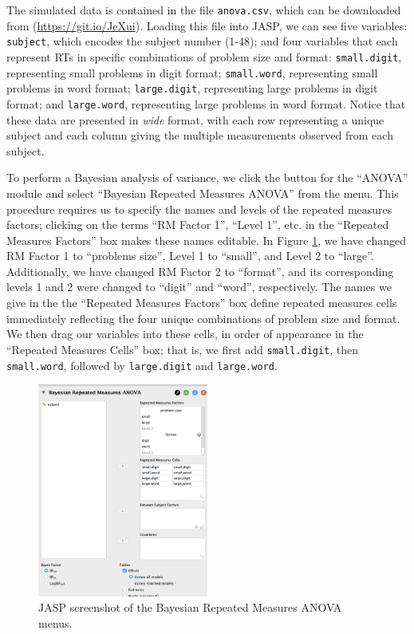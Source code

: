 \documentclass[english,,doc,floatsintext]{apa6}
\begin{document}
The simulated data is contained in the file \texttt{anova.csv}, which can be downloaded from (\url{https://git.io/JeXui}). Loading this file into JASP, we can see five variables: \texttt{subject}, which encodes the subject number (1-48); and four variables that each represent RTs in specific combinations of problem size and format: \texttt{small.digit}, representing small problems in digit format; \texttt{small.word}, representing small problems in word format; \texttt{large.digit}, representing large problems in digit format; and \texttt{large.word}, representing large problems in word format. Notice that these data are presented in \emph{wide} format, with each row representing a unique subject and each column giving the multiple measurements observed from each subject.

To perform a Bayesian analysis of variance, we click the button for the \enquote{ANOVA} module and select \enquote{Bayesian Repeated Measures ANOVA} from the menu. This procedure requires us to specify the names and levels of the repeated measures factors; clicking on the terms \enquote{RM Factor 1}, \enquote{Level 1}, etc. in the \enquote{Repeated Measures Factors} box makes these names editable. In Figure \ref{fig:repeatedMeasures1}, we have changed RM Factor 1 to \enquote{problems size}, Level 1 to \enquote{small}, and Level 2 to \enquote{large}. Additionally, we have changed RM Factor 2 to \enquote{format}, and its corresponding levels 1 and 2 were changed to \enquote{digit} and \enquote{word}, respectively. The names we give in the the \enquote{Repeated Measures Factors} box define repeated measures cells immediately reflecting the four unique combinations of problem size and format. We then drag our variables into these cells, in order of appearance in the \enquote{Repeated Measures Cells} box; that is, we first add \texttt{small.digit}, then \texttt{small.word}, followed by \texttt{large.digit} and \texttt{large.word}.

\begin{figure}
\centering
\includegraphics[width=0.5\textwidth,height=\textheight]{figures/repeatedMeasures1.png}
\caption{\label{fig:repeatedMeasures1}JASP screenshot of the Bayesian Repeated Measures ANOVA menus.}
\end{figure}
\end{document}
